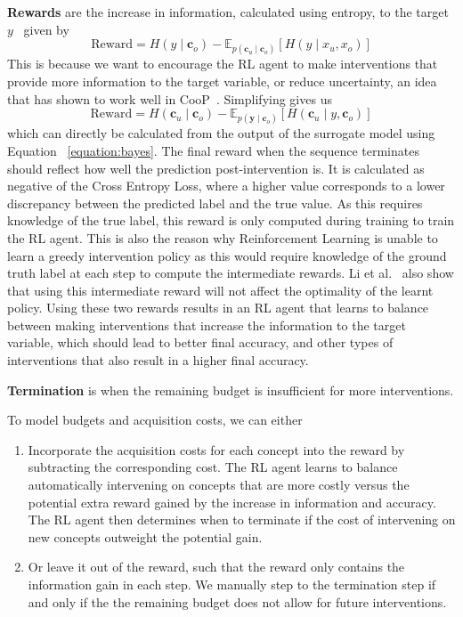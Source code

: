 \textbf{Rewards} are the increase in 
    information, calculated using entropy, to the target $y$~\cite{afa} given by
    \[\text{Reward} = H(y \mid \mathbf{c}_o) - \mathbb{E}_{p(\mathbf{c}_u \mid \mathbf{c}_o)} [H(y \mid x_u, x_o)]\]
    This is because we want to encourage the RL agent to make interventions
    that provide more information to the target variable, or reduce uncertainty, an idea that has shown
    to work well in CooP~\cite{coop}.
    Simplifying gives us
    \[\text{Reward} = H(\mathbf{c}_u \mid \mathbf{c}_o) - 
    \mathbb{E}_{p(\mathbf{y} \mid \mathbf{c}_o)} [H(\mathbf{c}_u \mid y, \mathbf{c}_o)]\]
    which can directly be calculated from the output of the surrogate model using Equation 
    ~\ref{equation:bayes}.
    The final reward when the sequence terminates 
    should reflect how well the prediction post-intervention is.
    It is calculated as negative of the Cross Entropy Loss, where a higher value corresponds to 
    a lower discrepancy between the predicted label and the true value. 
    As this requires knowledge of the true label,
    this reward is only computed during training to train the RL agent. 
    This is also the reason why
    Reinforcement Learning is unable to learn a greedy intervention policy as this would
    require knowledge of the ground truth label at each step to compute the intermediate rewards.
    Li et al.~\cite{afa} 
    also show that using this intermediate reward will not affect the optimality of the learnt policy.
    Using these two rewards
     results in an RL agent that learns to balance between making interventions that
    increase the information to the target variable, which should lead to better final accuracy,
    and other types of interventions that also result in a higher final accuracy.

    
\textbf{Termination} is when the remaining budget is insufficient for more interventions.
    

To model budgets and acquisition costs, we can either

\begin{enumerate}
    \item Incorporate the acquisition costs for each concept into the reward by subtracting
    the corresponding cost. The RL agent
    learns to balance automatically intervening on concepts that are more costly versus the
    potential extra reward gained by the increase in information and accuracy. The RL agent then determines when to terminate
    if the cost of intervening on new concepts outweight the potential gain.
    \item Or leave it out of the reward, such that
    the reward only contains the information gain in each step. 
    We manually step to the termination
    step if and only if the the remaining budget does not allow for future interventions.
\end{enumerate}

